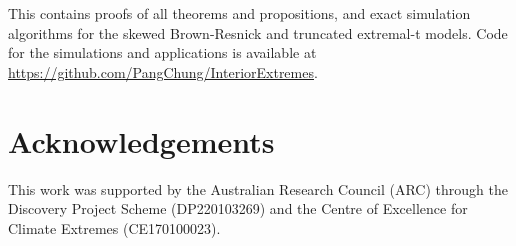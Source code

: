 \documentclass[12pt]{article}
\begin{document}
This contains proofs of all theorems and propositions, and exact simulation algorithms for the skewed Brown-Resnick and truncated extremal-t models. Code for the simulations and applications is available at \url{https://github.com/PangChung/InteriorExtremes}. 

\section*{Acknowledgements}

This work was supported by the Australian Research Council (ARC) through the Discovery Project Scheme (DP220103269) and the Centre of Excellence for Climate Extremes (CE170100023). 

\baselineskip=18pt


\end{document}
